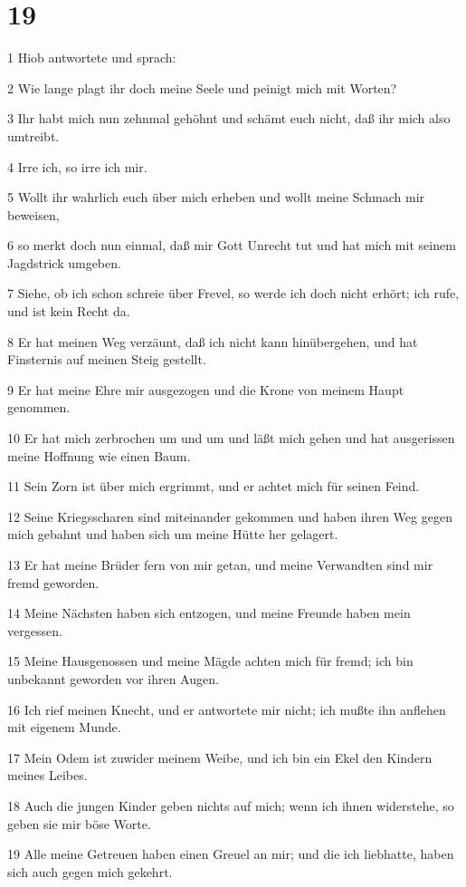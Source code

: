 \chapter{19}

\par 1 Hiob antwortete und sprach:
\par 2 Wie lange plagt ihr doch meine Seele und peinigt mich mit Worten?
\par 3 Ihr habt mich nun zehnmal gehöhnt und schämt euch nicht, daß ihr mich also umtreibt.
\par 4 Irre ich, so irre ich mir.
\par 5 Wollt ihr wahrlich euch über mich erheben und wollt meine Schmach mir beweisen,
\par 6 so merkt doch nun einmal, daß mir Gott Unrecht tut und hat mich mit seinem Jagdstrick umgeben.
\par 7 Siehe, ob ich schon schreie über Frevel, so werde ich doch nicht erhört; ich rufe, und ist kein Recht da.
\par 8 Er hat meinen Weg verzäunt, daß ich nicht kann hinübergehen, und hat Finsternis auf meinen Steig gestellt.
\par 9 Er hat meine Ehre mir ausgezogen und die Krone von meinem Haupt genommen.
\par 10 Er hat mich zerbrochen um und um und läßt mich gehen und hat ausgerissen meine Hoffnung wie einen Baum.
\par 11 Sein Zorn ist über mich ergrimmt, und er achtet mich für seinen Feind.
\par 12 Seine Kriegsscharen sind miteinander gekommen und haben ihren Weg gegen mich gebahnt und haben sich um meine Hütte her gelagert.
\par 13 Er hat meine Brüder fern von mir getan, und meine Verwandten sind mir fremd geworden.
\par 14 Meine Nächsten haben sich entzogen, und meine Freunde haben mein vergessen.
\par 15 Meine Hausgenossen und meine Mägde achten mich für fremd; ich bin unbekannt geworden vor ihren Augen.
\par 16 Ich rief meinen Knecht, und er antwortete mir nicht; ich mußte ihn anflehen mit eigenem Munde.
\par 17 Mein Odem ist zuwider meinem Weibe, und ich bin ein Ekel den Kindern meines Leibes.
\par 18 Auch die jungen Kinder geben nichts auf mich; wenn ich ihnen widerstehe, so geben sie mir böse Worte.
\par 19 Alle meine Getreuen haben einen Greuel an mir; und die ich liebhatte, haben sich auch gegen mich gekehrt.
